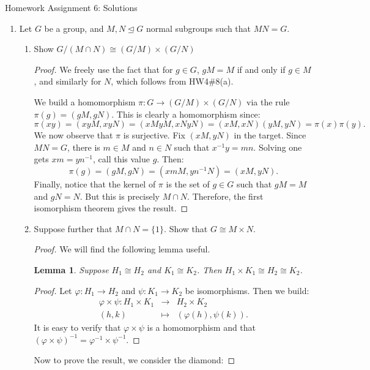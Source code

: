 \documentclass[11pt]{article}
\newtheorem{lemma}{Lemma}
\begin{document}
\begin{center}
\Large {Homework Assignment 6: Solutions}\\
\end{center}
\begin{enumerate}
  \item Let $G$ be a group, and $M,N\unlhd G$ normal subgroups such that $MN = G$.
  \begin{enumerate}
    \item Show $G/(M\cap N)\cong (G/M)\times (G/N)$
    \begin{proof}
      We freely use the fact that for $g\in G$, $gM=M$ if and only if $g\in M$, and similarly for $N$, which follows from HW4\#8(a).

      We build a homomorphism $\pi:G\to(G/M)\times(G/N)$ via the rule $\pi(g)=(gM,gN)$.  This is clearly a homomorphism since:
      \[\pi(xy) = (xyM,xyN) = (xMyM,xNyN) = (xM,xN)(yM,yN) = \pi(x)\pi(y).\]
      We now observe that $\pi$ is surjective.  Fix $(xM,yN)$ in the target.  Since $MN= G$, there is $m\in M$ and $n\in N$ such that $x^{-1}y = mn$.  Solving one gets $xm=yn^{-1}$, call this value $g$.  Then:
      \[\pi(g) = (gM,gN) = (xmM,yn^{-1}N) = (xM,yN).\]
      Finally, notice that the kernel of $\pi$ is the set of $g\in G$ such that $gM=M$ and $gN=N$.  But this is precisely $M\cap N$.  Therefore, the first isomorphism theorem gives the result.
    \end{proof}
    \item Suppose further that $M\cap N=\{1\}$.  Show that $G\cong M\times N$.
    \begin{proof}
      We will find the following lemma useful.
      \begin{lemma}
        Suppose $H_1\cong H_2$ and $K_1\cong K_2$.  Then $H_1\times K_1\cong H_2\cong K_2$.
      \end{lemma}
      \begin{proof}
        Let $\varphi:H_1\to H_2$ and $\psi:K_1\to K_2$ be isomorphisms.  Then we build:
        \begin{eqnarray*}
          \varphi\times\psi:H_1\times K_1&\longrightarrow&H_2\times K_2\\
          (h,k)&\mapsto&(\varphi(h),\psi(k)).
        \end{eqnarray*}
        It is easy to verify that $\varphi\times\psi$ is a homomorphism and that $(\varphi\times\psi)^{-1} = \varphi^{-1}\times\psi^{-1}$.
      \end{proof}
      Now to prove the result, we consider the diamond:

\end{proof}
\end{enumerate}
\end{enumerate}
\end{document}
